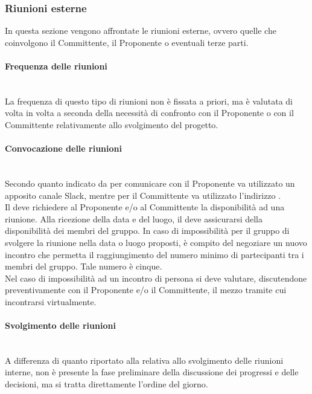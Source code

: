 \subsubsection{Riunioni esterne}
In questa sezione vengono affrontate le riunioni esterne, ovvero quelle che coinvolgono il Committente, il Proponente o eventuali terze parti.

\paragraph{Frequenza delle riunioni}\mbox{}\\
La frequenza di questo tipo di riunioni non è fissata a priori, ma è valutata di volta in volta a seconda della necessità di confronto con il Proponente o con il Committente relativamente allo svolgimento del progetto.

\paragraph{Convocazione delle riunioni}\mbox{}\\
Secondo quanto indicato da \Proponente{} per comunicare con il Proponente va utilizzato un apposito canale Slack, mentre per il Committente va utilizzato l'indirizzo \email{} \href{mailto:\GroupEmail}{\GroupEmail}.\\
Il \Responsabile{} deve richiedere al Proponente e/o al Committente la disponibilità ad una riunione. Alla ricezione della data e del luogo, il \Responsabile{} deve assicurarsi della disponibilità dei membri del gruppo. In caso di impossibilità per il gruppo di svolgere la riunione nella data o luogo proposti, è compito del \Responsabile{} negoziare un nuovo incontro che permetta il raggiungimento del numero minimo di partecipanti tra i membri del gruppo. Tale numero è cinque.\\
Nel caso di impossibilità ad un incontro di persona si deve valutare, discutendone preventivamente con il Proponente e/o il Committente, il mezzo tramite cui incontrarsi virtualmente.

\paragraph{Svolgimento delle riunioni}\mbox{}\\
A differenza di quanto riportato alla  relativa allo svolgimento delle riunioni interne, non è presente la fase preliminare della discussione dei progressi e delle decisioni, ma si tratta direttamente l'ordine del giorno.

